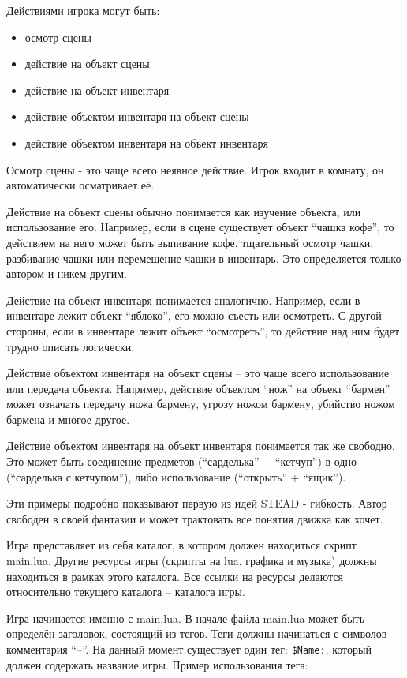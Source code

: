 \documentclass[a4paper,12pt]{article}
\begin{document}
Действиями игрока могут быть:

\begin{itemize}
\item {осмотр сцены}
\item {действие на объект сцены}
\item {действие на объект инвентаря}
\item {действие объектом инвентаря на объект сцены}
\item {действие объектом инвентаря на объект инвентаря}
\end{itemize}

Осмотр сцены - это чаще всего неявное действие. Игрок входит в комнату, он автоматически осматривает её.

Действие на объект сцены обычно понимается как изучение объекта, или использование его. Например, если в сцене существует объект ``чашка кофе'', то действием на него может быть выпивание кофе, тщательный осмотр чашки, разбивание чашки или перемещение чашки в инвентарь. Это определяется только автором и никем другим.

Действие на объект инвентаря понимается аналогично. Например, если в инвентаре лежит объект ``яблоко'', его можно съесть или осмотреть. С другой стороны, если в инвентаре лежит объект ``осмотреть'', то действие над ним будет трудно описать логически.

Действие объектом инвентаря на объект сцены -- это чаще всего использование или передача объекта. Например, действие объектом ``нож'' на объект ``бармен'' может означать передачу ножа бармену, угрозу ножом бармену, убийство ножом бармена и многое другое.

Действие объектом инвентаря на объект инвентаря понимается так же свободно. Это может быть соединение предметов (``сарделька'' + ``кетчуп'') в одно (``сарделька с кетчупом''), либо использование (``открыть'' + ``ящик'').

Эти примеры подробно показывают первую из идей STEAD - гибкость. Автор свободен в своей фантазии и может трактовать все понятия движка как хочет.

Игра представляет из себя каталог, в котором должен находиться скрипт main.lua. Другие ресурсы игры (скрипты на lua, графика и музыка) должны находиться в рамках этого каталога. Все ссылки на ресурсы делаются относительно текущего каталога -- каталога игры.

Игра начинается именно с main.lua. В начале файла main.lua может быть определён заголовок, состоящий из тегов. Теги должны начинаться с символов комментария ``--''. На данный момент существует один тег: \verb/$Name:/, который должен содержать название игры. Пример использования тега:
\end{document}
